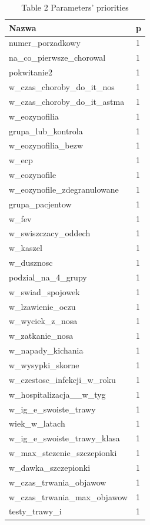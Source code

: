 \documentclass[10pt,oneside]{memoir}
\begin{document}
\begin{table}[htbp]
\begin{minipage}{\linewidth}
\setlength{\tymax}{0.5\linewidth}
\centering
\small
\caption{Table 2 Parameters' priorities}
\label{table2}
\begin{tabulary}{\linewidth}{@{}l@{}l@{}} \\ \toprule 
Nazwa&p \\\midrule
numer\_porzadkowy&1 \\
na\_co\_pierwsze\_chorowal&1 \\
pokwitanie2&1 \\
w\_czas\_choroby\_do\_it\_nos&1 \\
w\_czas\_choroby\_do\_it\_astma&1 \\
w\_eozynofilia&1 \\
grupa\_lub\_kontrola&1 \\
w\_eozynofilia\_bezw&1 \\
w\_ecp&1 \\
w\_eozynofile&1 \\
w\_eozynofile\_zdegranulowane&1 \\
grupa\_pacjentow&1 \\
w\_fev&1 \\
w\_swiszczacy\_oddech&1 \\
w\_kaszel&1 \\
w\_dusznosc&1 \\
podzial\_na\_4\_grupy&1 \\
w\_swiad\_spojowek&1 \\
w\_lzawienie\_oczu&1 \\
w\_wyciek\_z\_nosa&1 \\
w\_zatkanie\_nosa&1 \\
w\_napady\_kichania&1 \\
w\_wysypki\_skorne&1 \\
w\_czestosc\_infekcji\_w\_roku&1 \\
w\_hospitalizacja\_\_w\_tyg&1 \\
w\_ig\_e\_swoiste\_trawy&1 \\
wiek\_w\_latach&1 \\
w\_ig\_e\_swoiste\_trawy\_klasa&1 \\
w\_max\_stezenie\_szczepionki&1 \\
w\_dawka\_szczepionki&1 \\
w\_czas\_trwania\_objawow&1 \\
w\_czas\_trwania\_max\_objawow&1 \\
testy\_trawy\_i&1 \\

\end{tabulary}
\end{minipage}
\end{table}
\end{document}
